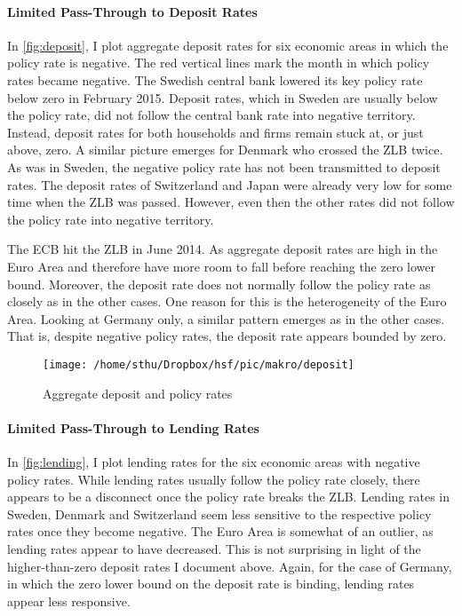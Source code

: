 \paragraph{Limited Pass-Through to Deposit Rates}
In \autoref{fig:deposit}, I plot aggregate deposit rates for six economic areas in which the policy rate is negative. The red vertical lines mark the month in which policy rates became negative. The Swedish central bank lowered its key policy rate below zero in February 2015. Deposit rates, which in Sweden are usually below the policy rate, did not follow the central bank rate into negative territory. Instead, deposit rates for both households and firms remain stuck at, or just above, zero. A similar picture emerges for Denmark who crossed the ZLB twice. As was in Sweden, the negative policy rate has not been transmitted to deposit rates.
The deposit rates of Switzerland  and Japan were already very low for some time when the ZLB was passed. However, even then the other rates did not follow the policy rate into negative territory.

The ECB hit the ZLB in June 2014. As aggregate deposit rates are high in the Euro Area and therefore have more room to fall before reaching the zero lower bound. Moreover, the deposit rate does not normally follow the policy rate as closely as in the other cases. One reason for this is the heterogeneity of the Euro Area. Looking at Germany only, a similar pattern emerges as in the other cases. That is, despite negative policy rates, the deposit rate appears bounded by zero. 


\begin{figure}
	\begin{center}
		\texttt{[image: /home/sthu/Dropbox/hsf/pic/makro/deposit]}
	\end{center}
	\caption{Aggregate deposit and policy rates}	
	\label{fig:deposit}
\end{figure}


\paragraph{Limited Pass-Through to Lending Rates}
In \autoref{fig:lending}, I plot lending rates for the six economic areas with negative policy rates. While lending
rates usually follow the policy rate closely, there appears to be a disconnect once the policy
rate breaks the ZLB. Lending rates in Sweden, Denmark and Switzerland seem less sensitive to the respective policy rates once they become negative. 
The Euro Area is somewhat of an outlier, as lending rates appear to have decreased. This is not surprising in light of the higher-than-zero deposit rates I document above. Again, for the case of
Germany, in which the zero lower bound on the deposit rate is binding, lending rates appear
less responsive.

